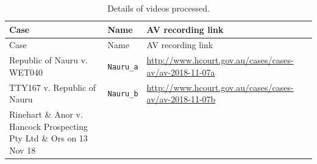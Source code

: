 \documentclass{monashthesis}
\begin{document}
\begin{longtable}[]{@{}lll@{}}
\caption{Details of videos processed.}\tabularnewline
\toprule
\begin{minipage}[b]{0.42\columnwidth}\raggedright
Case\strut
\end{minipage} & \begin{minipage}[b]{0.14\columnwidth}\raggedright
Name\strut
\end{minipage} & \begin{minipage}[b]{0.35\columnwidth}\raggedright
AV recording link\strut
\end{minipage}\tabularnewline
\midrule
\endfirsthead
\toprule
\begin{minipage}[b]{0.42\columnwidth}\raggedright
Case\strut
\end{minipage} & \begin{minipage}[b]{0.14\columnwidth}\raggedright
Name\strut
\end{minipage} & \begin{minipage}[b]{0.35\columnwidth}\raggedright
AV recording link\strut
\end{minipage}\tabularnewline
\midrule
\endhead
\begin{minipage}[t]{0.42\columnwidth}\raggedright
Republic of Nauru v. WET040\strut
\end{minipage} & \begin{minipage}[t]{0.14\columnwidth}\raggedright
\texttt{Nauru\_a}\strut
\end{minipage} & \begin{minipage}[t]{0.35\columnwidth}\raggedright
\url{http://www.hcourt.gov.au/cases/cases-av/av-2018-11-07a}\strut
\end{minipage}\tabularnewline
\begin{minipage}[t]{0.42\columnwidth}\raggedright
TTY167 v. Republic of Nauru\strut
\end{minipage} & \begin{minipage}[t]{0.14\columnwidth}\raggedright
\texttt{Nauru\_b}\strut
\end{minipage} & \begin{minipage}[t]{0.35\columnwidth}\raggedright
\url{http://www.hcourt.gov.au/cases/cases-av/av-2018-11-07b}\strut
\end{minipage}\tabularnewline
\begin{minipage}[t]{0.42\columnwidth}\raggedright
Rinehart \& Anor v. Hancock Prospecting Pty Ltd \& Ors on 13 Nov 18\strut
\end{minipage} & \begin{minipage}[t]{0.14\columnwidth}\raggedright

\end{minipage}
\end{longtable}
\end{document}
